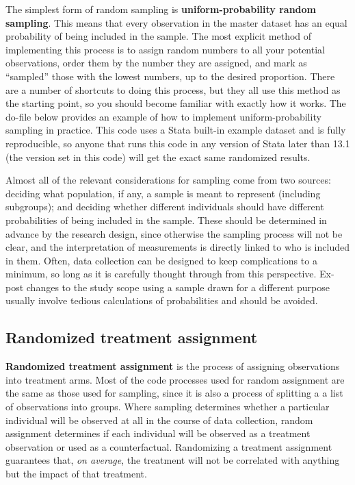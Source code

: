 The simplest form of random sampling is \textbf{uniform-probability random sampling}.
This means that every observation in the master dataset
has an equal probability of being included in the sample.
The most explicit method of implementing this process
is to assign random numbers to all your potential observations,
order them by the number they are assigned,
and mark as ``sampled'' those with the lowest numbers, up to the desired proportion.
There are a number of shortcuts to doing this process,
but they all use this method as the starting point,
so you should become familiar with exactly how it works.
The do-file below provides an example of
how to implement uniform-probability sampling in practice.
This code uses a Stata built-in example dataset and is fully reproducible,
so anyone that runs this code in any version of Stata later than 13.1
(the version set in this code)
will get the exact same randomized results.


Almost all of the relevant considerations for sampling come from two sources:
deciding what population, if any, a sample is meant to represent (including subgroups);
and deciding whether different individuals should have different probabilities
of being included in the sample.
These should be determined in advance by the research design,
since otherwise the sampling process will not be clear,
and the interpretation of measurements is directly linked to who is included in them.
Often, data collection can be designed to keep complications to a minimum,
so long as it is carefully thought through from this perspective.
Ex-post changes to the study scope using a sample drawn for a different purpose
usually involve tedious calculations of probabilities and should be avoided.


\subsection{Randomized treatment assignment}

\textbf{Randomized treatment assignment} is the process of assigning observations into treatment arms.
Most of the code processes used for random assignment are the same as those used for sampling,
since it is also a process of splitting a a list of observations into groups.
Where sampling determines whether a particular individual
will be observed at all in the course of data collection,
random assignment determines if each individual will be observed
as a treatment observation or used as a counterfactual.
Randomizing a treatment assignment guarantees that, \textit{on average},
the treatment will not be correlated with anything but the impact of that treatment.\cite{duflo2007using}


